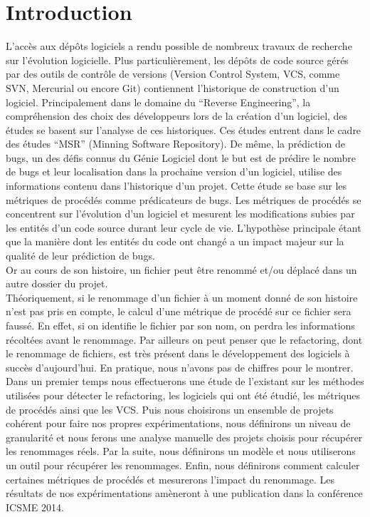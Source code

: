 \section{Introduction}
\label{sec:intro}

L'accès aux dépôts logiciels a rendu possible de nombreux travaux de recherche sur l'évolution logicielle. Plus particulièrement, les dépôts de code source gérés par des outils de contrôle de versions (Version Control System, VCS, comme SVN, Mercurial ou encore Git) contiennent l'historique de construction d'un logiciel. Principalement dans le domaine du ``Reverse Engineering'', la compréhension des choix des développeurs lors de la création d'un logiciel, des études se basent sur l'analyse de ces historiques. Ces études entrent dans le cadre des études ``MSR'' (Minning Software Repository). De même, la prédiction de bugs, un des défis connus du Génie Logiciel dont le but est de prédire le nombre de bugs et leur localisation dans la prochaine version d'un logiciel, utilise des informations contenu dans l'historique d'un projet. Cette étude se base sur les métriques de procédés comme prédicateurs de bugs. Les métriques de procédés se concentrent sur l'évolution d'un logiciel et mesurent les modifications subies par les entités d'un code source durant leur cycle de vie. L'hypothèse principale étant que la manière dont les entités du code ont changé a un impact majeur sur la qualité de leur prédiction de bugs.\\
Or au cours de son histoire, un fichier peut être renommé et/ou déplacé dans un autre dossier du projet.\\
Théoriquement, si le renommage d'un fichier à un moment donné de son histoire n'est pas pris en compte, le calcul d'une métrique de procédé sur ce fichier sera faussé. En effet, si on identifie le fichier par son nom, on perdra les informations récoltées avant le renommage. Par ailleurs on peut penser que le refactoring, dont le renommage de fichiers, est très présent dans le développement des logiciels à succès d'aujourd'hui. En pratique, nous n'avons pas de chiffres pour le montrer.\\ 
Dans un premier temps nous effectuerons une étude de l'existant sur les méthodes utilisées pour détecter le refactoring, les logiciels qui ont été étudié, les métriques de procédés ainsi que les VCS. Puis nous choisirons un ensemble de projets cohérent pour faire nos propres expérimentations, nous définirons un niveau de granularité et nous ferons une analyse manuelle des projets choisis pour récupérer les renommages réels. Par la suite, nous définirons un modèle et nous utiliserons un outil pour récupérer les renommages. Enfin, nous définirons comment calculer certaines métriques de procédés et mesurerons l'impact du renommage. Les résultats de nos expérimentations amèneront à une publication dans la conférence ICSME 2014.\\

